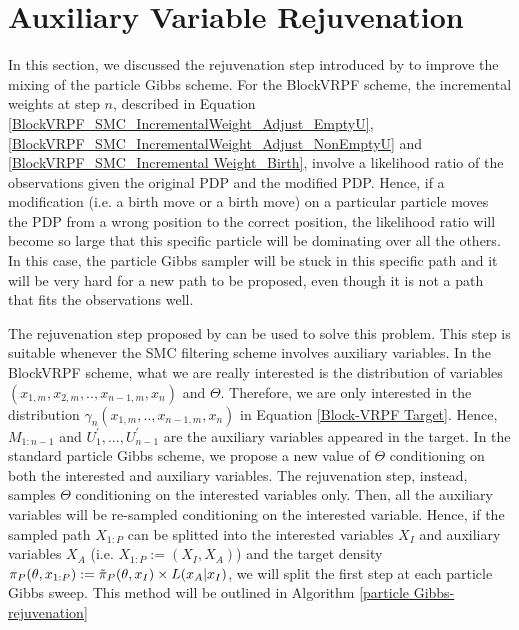 \documentclass[12pt,a4paper]{article}
\begin{document}
\section{Auxiliary Variable Rejuvenation}
In this section, we discussed the rejuvenation step introduced by \cite{finke2014static} to improve the mixing of the particle Gibbs scheme. For the BlockVRPF scheme, the incremental weights at step $n$, described in Equation \eqref{BlockVRPF_SMC_IncrementalWeight_Adjust_EmptyU},\eqref{BlockVRPF_SMC_IncrementalWeight_Adjust_NonEmptyU} and \eqref{BlockVRPF_SMC_Incremental Weight_Birth}, involve a likelihood ratio of the observations given the original PDP and the modified PDP. Hence, if a modification (i.e. a birth move or a birth move) on a particular particle moves the PDP from a wrong position to the correct position, the likelihood ratio will become so large that this specific particle will be dominating over all the others. In this case, the particle Gibbs sampler will be stuck in this specific path and it will be very hard for a new path to be proposed, even though it is not a path that fits the observations well. 

The rejuvenation step proposed by \cite{finke2014static} can be used to solve this problem. This step is suitable whenever the SMC filtering scheme involves auxiliary variables. In the BlockVRPF scheme, what we are really interested is the distribution of variables $(x_{1,m},x_{2,m},..,x_{n-1,m},x_n)$ and $\Theta$. Therefore, we are only interested in the distribution $\gamma_{n}(x_{1,m},..,\allowbreak x_{n-1,m},x_n)$ in Equation \eqref{Block-VRPF Target}. Hence, $M_{1:n-1}$ and $U_1^{'},...,U_{n-1}^{'}$ are the auxiliary variables appeared in the target. In the standard particle Gibbs scheme, we propose a new value of $\Theta$ conditioning on both the interested and auxiliary variables. The rejuvenation step, instead, samples $\Theta$ conditioning on the interested variables only. Then, all the auxiliary variables will be re-sampled conditioning on the interested variable. Hence, if the sampled path $X_{1:P}$ can be splitted into the interested variables $X_I$ and auxiliary variables $X_A$ (i.e. $X_{1:P} := (X_I,X_A)$) and the target density $\pi_{P}(\theta,x_{1:P}) := \Tilde{\pi}_P(\theta,x_I)\times L(x_A|x_I)$, we will split the first step at each particle Gibbs sweep. This method will be outlined in Algorithm \ref{particle Gibbs-rejuvenation}
\end{document}
